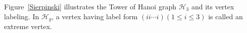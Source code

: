 \documentclass[10pt,journal,compsoc,twocolumn,twoside]{IEEEtran}
\begin{document}
Figure~\ref{Sierpinski} illustrates the  Tower of Hanoi graph \(\mathcal{H}_{3}\) and its vertex labeling. In \(\mathcal{H}_{g}\), a vertex having label form \((ii\cdots i)(1\le i\le 3)\) is called an extreme vertex.


\begin{figure}[!t]
    \centering
\end{figure}
\end{document}

